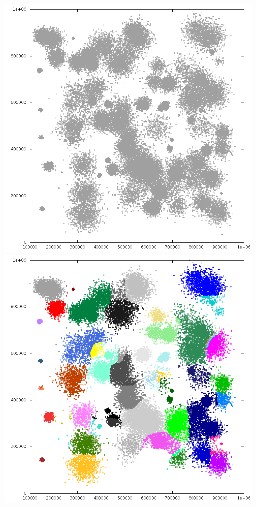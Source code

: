 \documentclass[10pt]{beamer}
\begin{document}
\begin{frame}
	\frametitle{}
	\includegraphics[scale=0.22, keepaspectratio]{../output/pics/birch3_black.png}
	\includegraphics[scale=0.22, keepaspectratio]{../output/pics/birch3_colored.png}
\end{frame}
\end{document}

